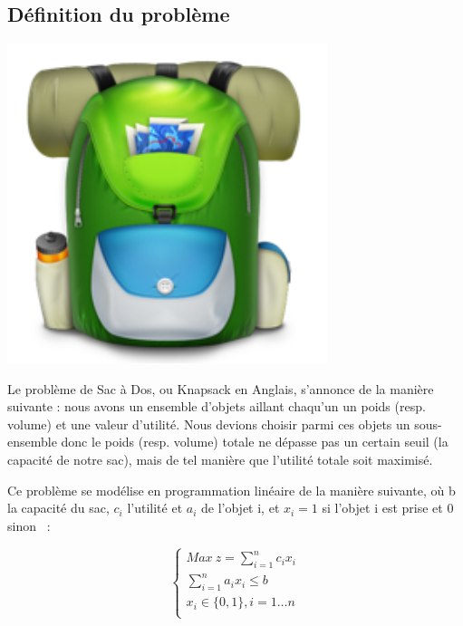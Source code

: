 \subsection{Définition du problème}

\begin{minipage}[b]{0.3\linewidth}
\centering
\includegraphics[width=0.7\textwidth]{../images/Knapsack.png}
\end{minipage}
\hspace{0.5cm}
\begin{minipage}[b]{0.7\linewidth}
Le problème de Sac à Dos, ou \og Knapsack \fg{} en Anglais, s'annonce de la manière suivante : nous avons un ensemble d'objets aillant chaqu'un un poids (resp. volume) et une valeur d'utilité. Nous devions choisir parmi ces objets un sous-ensemble donc le poids (resp. volume) totale ne dépasse pas un certain seuil (la capacité de notre sac), mais de tel manière que l'utilité totale soit maximisé.
\end{minipage}

Ce problème se modélise en programmation linéaire de la
manière suivante, où b la capacité du sac, $c_i$ l'utilité et $a_i$ de l'objet i, et $x_i = 1$ si l'objet i est prise et $0$ sinon ~:

\begin{equation}
\begin{cases}
Max~z=\sum_{i=1}^nc_ix_i \\
\sum_{i=1}^na_ix_i \leq b \\
x_i \in\{0, 1\}, i=1\dots n\\
\end{cases}
\end{equation}

